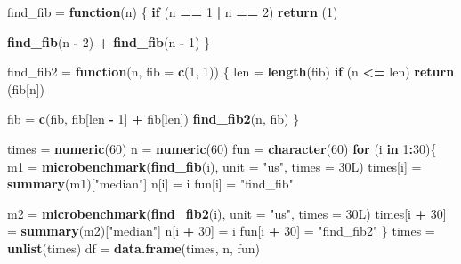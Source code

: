 \documentclass[
]{article}
\newenvironment{Shaded}{\begin{snugshade}}{\end{snugshade}}
\newcommand{\ControlFlowTok}[1]{\textcolor[rgb]{0.13,0.29,0.53}{\textbf{#1}}}
\newcommand{\DataTypeTok}[1]{\textcolor[rgb]{0.13,0.29,0.53}{#1}}
\newcommand{\DecValTok}[1]{\textcolor[rgb]{0.00,0.00,0.81}{#1}}
\newcommand{\KeywordTok}[1]{\textcolor[rgb]{0.13,0.29,0.53}{\textbf{#1}}}
\newcommand{\NormalTok}[1]{#1}
\newcommand{\OperatorTok}[1]{\textcolor[rgb]{0.81,0.36,0.00}{\textbf{#1}}}
\newcommand{\StringTok}[1]{\textcolor[rgb]{0.31,0.60,0.02}{#1}}
\begin{document}
\begin{Shaded}
\begin{Highlighting}[]
\NormalTok{find\_fib =}\StringTok{ }\ControlFlowTok{function}\NormalTok{(n) \{}
  \ControlFlowTok{if}\NormalTok{ (n }\OperatorTok{==}\StringTok{ }\DecValTok{1} \OperatorTok{|}\StringTok{ }\NormalTok{n }\OperatorTok{==}\StringTok{ }\DecValTok{2}\NormalTok{)}
    \KeywordTok{return}\NormalTok{ (}\DecValTok{1}\NormalTok{)}

  \KeywordTok{find\_fib}\NormalTok{(n }\OperatorTok{{-}}\StringTok{ }\DecValTok{2}\NormalTok{) }\OperatorTok{+}\StringTok{ }\KeywordTok{find\_fib}\NormalTok{(n }\OperatorTok{{-}}\StringTok{ }\DecValTok{1}\NormalTok{)}
\NormalTok{\}}

\NormalTok{find\_fib2 =}\StringTok{ }\ControlFlowTok{function}\NormalTok{(n, }\DataTypeTok{fib =} \KeywordTok{c}\NormalTok{(}\DecValTok{1}\NormalTok{, }\DecValTok{1}\NormalTok{)) \{}
\NormalTok{  len =}\StringTok{ }\KeywordTok{length}\NormalTok{(fib)}
  \ControlFlowTok{if}\NormalTok{ (n }\OperatorTok{\textless{}=}\StringTok{ }\NormalTok{len)}
    \KeywordTok{return}\NormalTok{ (fib[n])}

\NormalTok{  fib =}\StringTok{ }\KeywordTok{c}\NormalTok{(fib, fib[len }\OperatorTok{{-}}\StringTok{ }\DecValTok{1}\NormalTok{] }\OperatorTok{+}\StringTok{ }\NormalTok{fib[len])}
  \KeywordTok{find\_fib2}\NormalTok{(n, fib)}
\NormalTok{\}}

\NormalTok{times =}\StringTok{ }\KeywordTok{numeric}\NormalTok{(}\DecValTok{60}\NormalTok{)}
\NormalTok{n =}\StringTok{ }\KeywordTok{numeric}\NormalTok{(}\DecValTok{60}\NormalTok{)}
\NormalTok{fun =}\StringTok{ }\KeywordTok{character}\NormalTok{(}\DecValTok{60}\NormalTok{)}
\ControlFlowTok{for}\NormalTok{ (i }\ControlFlowTok{in} \DecValTok{1}\OperatorTok{:}\DecValTok{30}\NormalTok{)\{}
\NormalTok{   m1 =}\StringTok{ }\KeywordTok{microbenchmark}\NormalTok{(}\KeywordTok{find\_fib}\NormalTok{(i), }\DataTypeTok{unit =} \StringTok{"us"}\NormalTok{, }\DataTypeTok{times =}\NormalTok{ 30L)}
\NormalTok{   times[i] =}\StringTok{ }\KeywordTok{summary}\NormalTok{(m1)[}\StringTok{"median"}\NormalTok{]}
\NormalTok{   n[i] =}\StringTok{ }\NormalTok{i}
\NormalTok{   fun[i] =}\StringTok{ "find\_fib"}

\NormalTok{   m2 =}\StringTok{ }\KeywordTok{microbenchmark}\NormalTok{(}\KeywordTok{find\_fib2}\NormalTok{(i), }\DataTypeTok{unit =} \StringTok{"us"}\NormalTok{, }\DataTypeTok{times =}\NormalTok{ 30L)}
\NormalTok{   times[i }\OperatorTok{+}\StringTok{ }\DecValTok{30}\NormalTok{] =}\StringTok{ }\KeywordTok{summary}\NormalTok{(m2)[}\StringTok{"median"}\NormalTok{]}
\NormalTok{   n[i }\OperatorTok{+}\StringTok{ }\DecValTok{30}\NormalTok{] =}\StringTok{ }\NormalTok{i}
\NormalTok{   fun[i }\OperatorTok{+}\StringTok{ }\DecValTok{30}\NormalTok{] =}\StringTok{ "find\_fib2"}
\NormalTok{\}}
\NormalTok{times =}\StringTok{ }\KeywordTok{unlist}\NormalTok{(times)}
\NormalTok{df =}\StringTok{ }\KeywordTok{data.frame}\NormalTok{(times, n, fun)}
\end{Highlighting}
\end{Shaded}
\end{document}
